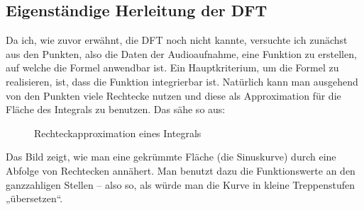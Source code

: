 \documentclass[a4paper,12pt]{article}
\theoremstyle{definition}
\theoremstyle{remark}
\begin{document}
\subsection{Eigenständige Herleitung der DFT}
Da ich, wie zuvor erwähnt, die DFT noch nicht kannte, versuchte ich zunächst aus den Punkten, 
also die Daten der Audioaufnahme, eine Funktion zu erstellen, auf welche die Formel anwendbar 
ist. Ein Hauptkriterium, um die Formel zu realisieren, ist, dass die Funktion integrierbar ist. 
Natürlich kann man ausgehend von den Punkten viele Rechtecke nutzen und diese als Approximation 
für die Fläche des Integrals zu benutzen. Das sähe so aus:

\begin{figure}[H]
\centering
{}
\caption{Rechteckapproximation eines Integrals}
\end{figure}
Das Bild zeigt, wie man eine gekrümmte Fläche (die Sinuskurve) durch eine Abfolge von Rechtecken 
annähert. Man benutzt dazu die Funktionswerte an den ganzzahligen Stellen – also so, als würde 
man die Kurve in kleine Treppenstufen „übersetzen“. 
\end{document}
